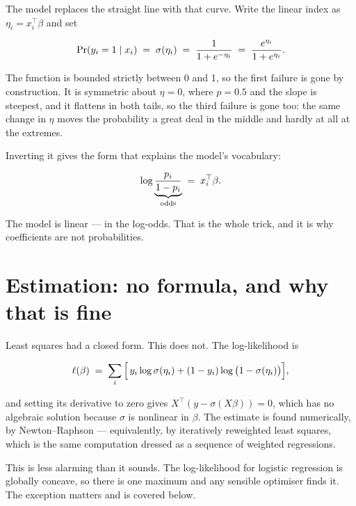 \documentclass[
  letterpaper,
  10pt,
  twoside,
  openright,
  numbers=noenddot,
  chapterprefix=true]{scrbook}
\begin{document}
The model replaces the straight line with that curve. Write the linear
index as \(\eta_i = x_i^\top \beta\) and set

\[
\Pr(y_i = 1 \mid x_i) \thickspace=\thickspace \sigma(\eta_i) \thickspace=\thickspace \frac{1}{1 + e^{-\eta_i}}
\thickspace=\thickspace \frac{e^{\eta_i}}{1 + e^{\eta_i}} .
\]

The function is bounded strictly between 0 and 1, so the first failure
is gone by construction. It is symmetric about \(\eta = 0\), where
\(p = 0.5\) and the slope is steepest, and it flattens in both tails, so
the third failure is gone too: the same change in \(\eta\) moves the
probability a great deal in the middle and hardly at all at the
extremes.

Inverting it gives the form that explains the model's vocabulary:

\[
\log \underbrace{\frac{p_i}{1 - p_i}}_{\text{odds}} \thickspace=\thickspace x_i^\top \beta .
\]

The model is linear --- in the log-odds. That is the whole trick, and it
is why coefficients are not probabilities.

\section{Estimation: no formula, and why that is
fine}\label{estimation-no-formula-and-why-that-is-fine}

Least squares had a closed form. This does not. The log-likelihood is

\[
\ell(\beta) \thickspace=\thickspace \sum_i \Big[\thinspace y_i \log \sigma(\eta_i) + (1 - y_i)\log\big(1 - \sigma(\eta_i)\big) \Big],
\]

and setting its derivative to zero gives
\(X^\top(y - \sigma(X\beta)) = 0\), which has no algebraic solution
because \(\sigma\) is nonlinear in \(\beta\). The estimate is found
numerically, by Newton--Raphson --- equivalently, by iteratively
reweighted least squares, which is the same computation dressed as a
sequence of weighted regressions.

This is less alarming than it sounds. The log-likelihood for logistic
regression is globally concave, so there is one maximum and any sensible
optimiser finds it. The exception matters and is covered below.
\end{document}
